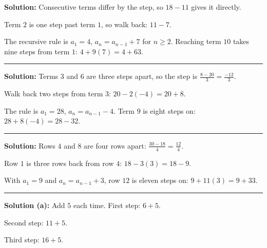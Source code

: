 \documentclass[12pt]{article}
\begin{document}



\textbf{Solution:} Consecutive terms differ by the step, so $18 - 11$ gives it directly. 

Term $2$ is one step past term $1$, so walk back: $11 - 7$. 

The recursive rule is $a_1 = 4$, $a_n = a_{n-1} + 7$ for $n \ge 2$. Reaching term $10$ takes nine steps from term $1$: $4 + 9(7) = 4 + 63$. 

\vspace{0.2cm}\noindent\rule{\linewidth}{0.2pt}


\textbf{Solution:} Terms $3$ and $6$ are three steps apart, so the step is $\frac{8 - 20}{3} = \frac{-12}{3}$. 

Walk back two steps from term $3$: $20 - 2(-4) = 20 + 8$. 

The rule is $a_1 = 28$, $a_n = a_{n-1} - 4$. Term $9$ is eight steps on: $28 + 8(-4) = 28 - 32$. 

\vspace{0.2cm}\noindent\rule{\linewidth}{0.2pt}


\textbf{Solution:} Rows $4$ and $8$ are four rows apart: $\frac{30 - 18}{4} = \frac{12}{4}$. 

Row $1$ is three rows back from row $4$: $18 - 3(3) = 18 - 9$. 

With $a_1 = 9$ and $a_n = a_{n-1} + 3$, row $12$ is eleven steps on: $9 + 11(3) = 9 + 33$. 

\vspace{0.2cm}\noindent\rule{\linewidth}{0.2pt}


\textbf{Solution (a):} Add $5$ each time. First step: $6 + 5$. 

Second step: $11 + 5$. 

Third step: $16 + 5$. 
\end{document}
